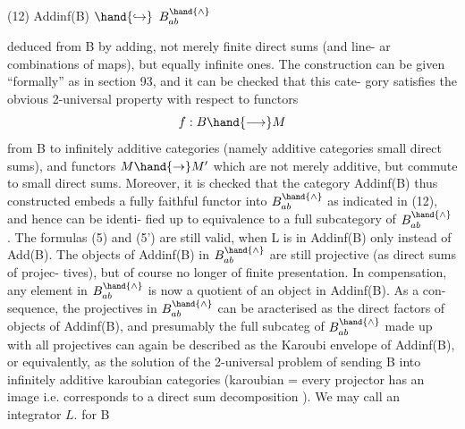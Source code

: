 
(12) \qquad Addinf(B) $\hand{\hookrightarrow}$ $B^{\hand{\wedge}}_{ab}$

deduced from B  by adding, not merely finite direct sums (and line-%
ar combinations of maps), but equally infinite ones. The construction can
be given ``formally'' as in section 93, and it can be checked that this cate-%
gory satisfies the obvious 2-universal property with respect to functors
\[ f : B \hand{\longrightarrow} M \]
from B to infinitely additive  categories  (namely additive categories
 small direct sums), and functors $M \hand{\rightarrow} M'$ which 
are not merely additive, but commute to small direct sums. Moreover, it
is checked that the category Addinf(B) thus constructed embeds  a fully
faithful functor into $B^{\hand{\wedge}}_{ab}$ as indicated in (12), and hence can be identi-%
fied up to equivalence to a full subcategory of $B^{\hand{\wedge}}_{ab}$ . The formulas (5) and
(5') are still valid, when L is in Addinf(B) only instead of Add(B). The
objects of Addinf(B) in $B^{\hand{\wedge}}_{ab}$ are still projective (as direct sums of projec-%
tives), but of course no longer of finite presentation. In compensation,
any element in $B^{\hand{\wedge}}_{ab}$ is now a quotient of an object in Addinf(B). As a con-%
sequence, the projectives in $B^{\hand{\wedge}}_{ab}$ can be aracterised as the direct factors
of  objects of Addinf(B), and presumably the full subcateg
of $B^{\hand{\wedge}}_{ab}$ made up with all projectives can again be described  as the Karoubi
envelope of Addinf(B), or equivalently, as the  solution of
the 2-universal problem of sending B into infinitely additive karoubian
categories (karoubian = every projector has an image \over{\unsure{;}}{\unsure{,}} i.e. corresponds
to a direct sum decomposition ). We may call an integrator $L.$ for B
